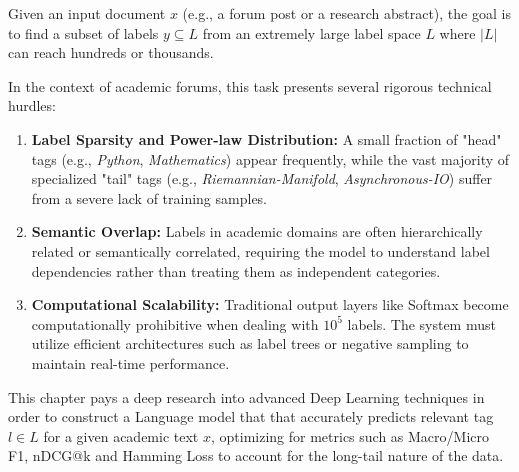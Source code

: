 \documentclass[a4paper]{report}
\begin{document}
Given an input document $x$ (e.g., a forum post or a research abstract), the goal is to find a subset of labels $y \subseteq L$ from an extremely large label space $L$ where $|L|$ can reach hundreds or thousands. 

In the context of academic forums, this task presents several rigorous technical hurdles:
\begin{enumerate}
    \item \textbf{Label Sparsity and Power-law Distribution:} A small fraction of "head" tags (e.g., \textit{Python}, \textit{Mathematics}) appear frequently, while the vast majority of specialized "tail" tags (e.g., \textit{Riemannian-Manifold}, \textit{Asynchronous-IO}) suffer from a severe lack of training samples.
    \item \textbf{Semantic Overlap:} Labels in academic domains are often hierarchically related or semantically correlated, requiring the model to understand label dependencies rather than treating them as independent categories.
    \item \textbf{Computational Scalability:} Traditional output layers like Softmax become computationally prohibitive when dealing with $10^5$ labels. The system must utilize efficient architectures such as label trees or negative sampling to maintain real-time performance.
\end{enumerate}
This chapter pays a deep research into advanced Deep Learning techniques in order to construct a Language model that that accurately predicts relevant tag $l \in L$ for a given academic text $x$, optimizing for metrics such as Macro/Micro F1, nDCG@k and Hamming Loss to account for the long-tail nature of the data.


\newpage

\end{document}
